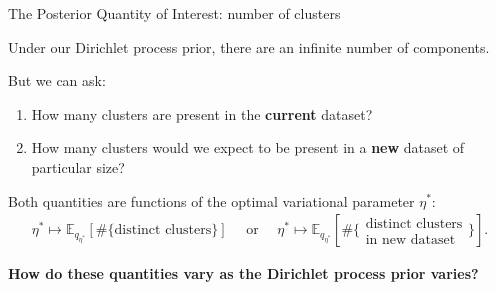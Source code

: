 \documentclass[10pt]{beamer}\usepackage[]{graphicx}\usepackage[]{color}
\newcommand{\Expect}{\mathbb{E}}
\begin{document}
\begin{frame}{The Posterior Quantity of Interest: number of clusters}

Under our Dirichlet process prior, there are an infinite number of components. 

But we can ask: 
\begin{enumerate}[(1)]

\pause 

\item How many clusters are present in the {\bf current} dataset?

\pause 

\item How many clusters would we expect to be present in a {\bf new} dataset of particular size?

\pause

\end{enumerate}
\vspace{0.2in}
Both quantities are functions of the optimal variational parameter $\eta^*$: 
%
\begin{align*}
\eta^* \mapsto
\Expect_{q_{\eta^*}} \left[ \#\{\text{distinct clusters}\} \right]
\quad \text{ or } \quad
\eta^* \mapsto
\Expect_{q_{\eta^*}} 
\left[\#\{\substack{\text{distinct clusters}\\\text{in new dataset}}\} \right].
\end{align*}

\begin{mdframed}[style=MyFrame]
\begin{center} 
{\bf How do these quantities vary as the Dirichlet process prior varies?}
\end{center}
\end{mdframed}

\end{frame}
\end{document}
